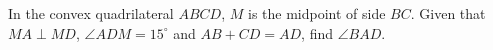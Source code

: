In the convex quadrilateral $ABCD$, $M$ is the midpoint of side $BC$. Given that $MA\perp MD$, $\angle ADM=15^\circ$ and $AB+CD=AD$, find $\angle BAD$.
